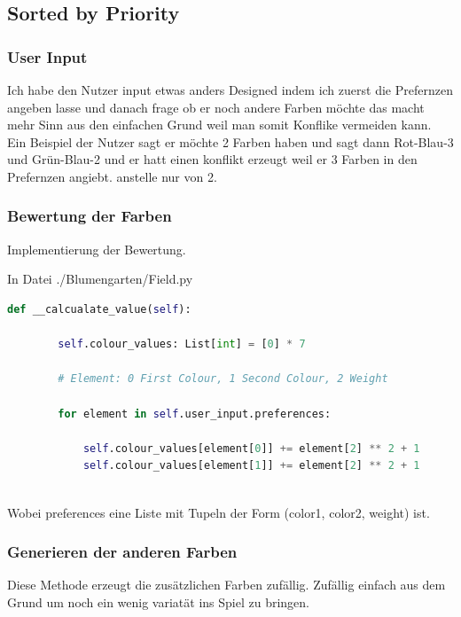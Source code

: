 \documentclass{article}
\begin{document}
\newpage

\subsection{Sorted by Priority}

\subsubsection{ User Input }

Ich habe den Nutzer input etwas anders Designed indem ich zuerst die Prefernzen angeben lasse und danach frage ob er noch andere Farben möchte das macht mehr Sinn aus den einfachen Grund weil man somit Konflike vermeiden kann. Ein Beispiel der Nutzer sagt er möchte 2 Farben haben und sagt dann Rot-Blau-3 und Grün-Blau-2 und er hatt einen konflikt erzeugt weil er 3 Farben in den Prefernzen angiebt. anstelle nur von 2.


\subsubsection{Bewertung der Farben}

Implementierung der Bewertung. \newline

In Datei ./Blumengarten/Field.py
\begin{lstlisting}[language=Python]
    def __calcualate_value(self):

        self.colour_values: List[int] = [0] * 7

        # Element: 0 First Colour, 1 Second Colour, 2 Weight

        for element in self.user_input.preferences:

            self.colour_values[element[0]] += element[2] ** 2 + 1
            self.colour_values[element[1]] += element[2] ** 2 + 1	
	
\end{lstlisting}

Wobei preferences eine Liste mit Tupeln der Form (color1, color2, weight) ist.

\subsubsection{Generieren der anderen Farben}

Diese Methode erzeugt die zusätzlichen Farben zufällig. Zufällig einfach aus dem Grund um noch ein wenig variatät ins Spiel zu bringen.
\end{document}
